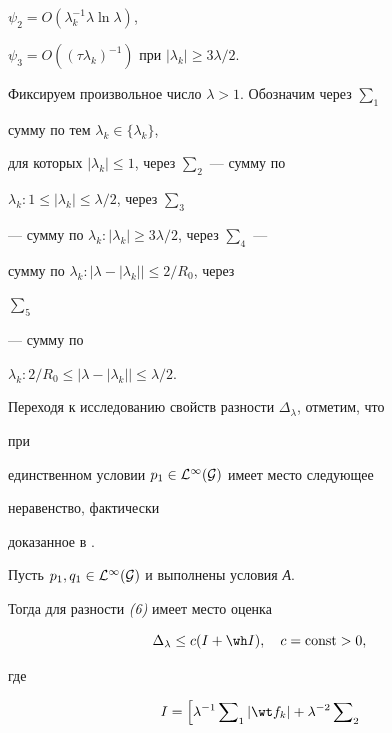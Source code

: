 {\begin{lem}
\begin{itemize}
$\psi_2=O(\lambda^{-1}_k\lambda\ln\lambda)$,


$\psi_3=O((\tau\lambda_k)^{-1})$ при $|\lambda_k|\ge 3\lambda/2$.


\end{itemize}


\end{lem}





Фиксируем произвольное число $\lambda>1$. Обозначим через $\sum_1$


сумму по тем $\lambda_k\in\{\lambda_k\}$,


для которых $|\lambda_k|\le 1$, через $\sum_2$ --- сумму по


$\lambda_k:1\le|\lambda_k|\le\lambda/2$, через $\sum_3$


--- сумму по $\lambda_k:|\lambda_k|\ge 3\lambda/2$, через $\sum_4$ ---


сумму по $\lambda_k:\bigl|\lambda-|\lambda_k|\bigr|\le 2/R_0$, через


$\sum_5$


--- сумму по


$\lambda_k:2/R_0\le\bigl|\lambda-|\lambda_k|\bigr|\le\lambda/2$.





Переходя к исследованию свойств разности $\Delta_\lambda$, отметим, что


при


единственном условии $p_1\in\cal L^1(G)$ имеет место следующее


неравенство, фактически


доказанное в \cite{12}.





\begin{lem} Пусть $p_1,q_1\in\cal L^1(G)$ и выполнены условия {\em А}.


Тогда для разности {\em (6)} имеет место оценка


\begin{equation}


\Delta_\lambda\le c(I+\wh I),\quad c=\const>0,


\end{equation}


где


\begin{multline}


I = \Bigl[ \lambda^{-1} \sumn_1 |\wt f_k| +\lambda^{-2} \sumn_2



\end{multline}
\end{lem}}
